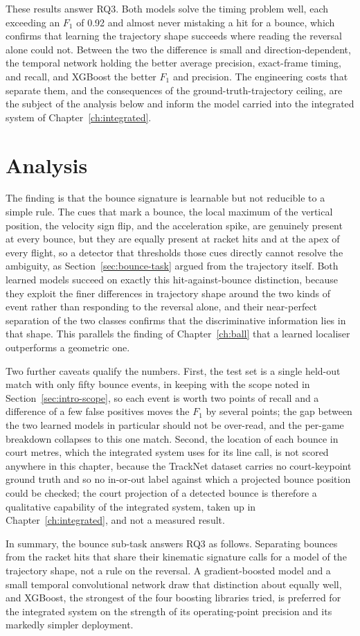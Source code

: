 These results answer RQ3. Both models solve the timing problem well, each
exceeding an $F_1$ of 0.92 and almost never mistaking a hit for a bounce, which
confirms that learning the trajectory shape succeeds where reading the reversal
alone could not. Between the two the difference is small and direction-dependent,
the temporal network holding the better average precision, exact-frame timing, and
recall, and XGBoost the better $F_1$ and precision. The
engineering costs that separate them, and the consequences of the
ground-truth-trajectory ceiling, are the subject of the analysis below and inform
the model carried into the integrated system of Chapter~\ref{ch:integrated}.

\section{Analysis}
\label{sec:bounce-analysis}

The finding is that the bounce signature is learnable but not reducible to a
simple rule. The cues that mark a bounce, the local maximum of the vertical
position, the velocity sign flip, and the acceleration spike, are genuinely present
at every bounce, but they are equally present at racket hits and at the apex of
every flight, so a detector that thresholds those cues directly cannot resolve the
ambiguity, as Section~\ref{sec:bounce-task} argued from the trajectory itself. Both
learned models succeed on exactly this hit-against-bounce distinction, because they
exploit the finer differences in trajectory shape around the two kinds of event
rather than responding to the reversal alone, and their near-perfect separation of
the two classes confirms that the discriminative information lies in that shape.
This parallels the finding of Chapter~\ref{ch:ball} that a learned localiser
outperforms a geometric one.

Two further caveats qualify the numbers. First, the test set is a single held-out
match with only fifty bounce events, in keeping with the scope noted in
Section~\ref{sec:intro-scope}, so each event is worth two points of recall and a
difference of a few false positives moves the $F_1$ by several points; the gap
between the two learned models in particular should not be over-read, and the
per-game breakdown collapses to this one match. Second, the location of each bounce
in court metres, which the integrated system uses for its line call, is not scored
anywhere in this chapter, because the TrackNet dataset carries no court-keypoint
ground truth and so no in-or-out label against which a projected bounce position
could be checked; the court projection of a detected bounce is therefore a
qualitative capability of the integrated system, taken up in
Chapter~\ref{ch:integrated}, and not a measured result.

In summary, the bounce sub-task answers RQ3 as follows. Separating bounces from the
racket hits that share their kinematic signature calls for a model of the
trajectory shape, not a rule on the reversal. A gradient-boosted model and a small
temporal convolutional network draw that distinction about equally well, and XGBoost, the strongest of the four boosting libraries
tried, is preferred for the integrated system on the strength of its operating-point
precision and its markedly simpler deployment.